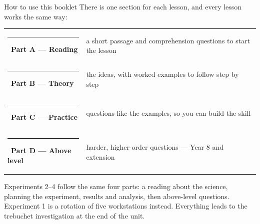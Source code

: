 \documentclass[11pt,a4paper]{article}
\begin{document}
\begin{infobox}{How to use this booklet}
There is one section for each lesson, and every lesson works the same way:

\medskip
\begin{tabular}{@{}ll@{}}
  \textcolor{Teal}{\rule{10pt}{10pt}}\ \textbf{Part A --- Reading} & a short passage and comprehension questions to start the lesson \\
  \textcolor{Blue}{\rule{10pt}{10pt}}\ \textbf{Part B --- Theory} & the ideas, with worked examples to follow step by step \\
  \textcolor{Amber}{\rule{10pt}{10pt}}\ \textbf{Part C --- Practice} & questions like the examples, so you can build the skill \\
  \textcolor{Violet}{\rule{10pt}{10pt}}\ \textbf{Part D --- Above level} & harder, higher-order questions --- Year 8 and extension \\
\end{tabular}

\medskip
Experiments 2--4 follow the same four parts: a reading about the science, planning the experiment, results and analysis, then above-level questions. Experiment 1 is a rotation of five workstations instead. Everything leads to the trebuchet investigation at the end of the unit.
\end{infobox}

\vspace{8pt}
\end{document}
